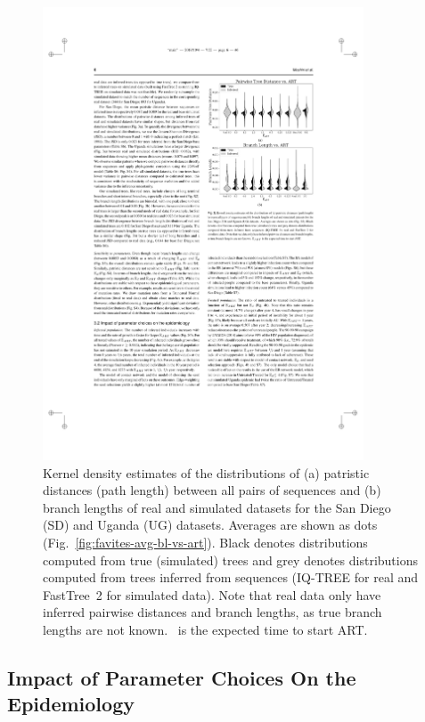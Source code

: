 \begin{figure} %
\centering
\includegraphics[width=0.85\textwidth]{figs/favites-real-vs-sim}
\caption[Real vs. Simulated Phylogenies]
{Kernel density estimates of the distributions of (a) patristic distances (path length) between all pairs of sequences and (b) branch lengths of real and simulated datasets for the San Diego (SD) and Uganda (UG) datasets. Averages are shown as dots (Fig.~\ref{fig:favites-avg-bl-vs-art}). Black denotes distributions computed from true (simulated) trees and grey denotes distributions computed from trees inferred from sequences (IQ-TREE for real and FastTree~2 for simulated data).  Note that real data only have inferred pairwise distances and branch lengths, as true branch lengths are not known. \EART\ is the expected time to start ART.}
\label{fig:favites-real-vs-sim}
\end{figure}

\subsection{Impact of Parameter Choices On the Epidemiology}
